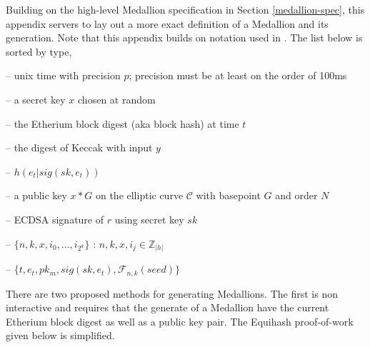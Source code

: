 
Building on the high-level Medallion specification in Section \ref{medallion-spec}, this appendix servers to lay out a more exact definition of a Medallion and its generation. Note that this appendix builds on notation used in \cite{Equihash}. The list below is sorted by type,
\begin{description}[align=right, labelwidth=2.7cm]
	\item[$t$ (uint)] -- unix time with precision $p$; precision must be at least on the order of 100ms
	\item[$sk_m$ (uint)]  -- a secret key $x$ chosen at random
    \item[$e_t$ (uint)]  -- the Etherium block digest (aka block hash) at time $t$ 
    \item[$h(y)$ (uint)]  -- the digest of Keccak with input $y$
    \item[$seed$ (uint)]  -- $h(e_t|sig(sk,e_t))$
    \item[$pk_m$ (tuple)]  -- a public key $x*G$ on the elliptic curve $\mathcal{C}$ with basepoint $G$ and order $N$
    \item[$sig(sk, r)$ (tuple)]  -- ECDSA signature of $r$ using secret key $sk$
    \item[$\mathcal{F}_{n,k}(x)$ (struct)] -- $\{n, k, x, i_0, ..., i_{2^{k}} \}$ : $n,k,x,i_j \in\mathbb{Z}_{|h|}$
	\item[$\mathcal{M}$ (struct)] -- $\{t, e_t, pk_m, sig(sk,e_t), \mathcal{F}_{n,k}(seed)\}$
\end{description}

There are two proposed methods for generating Medallions. The first is non interactive and requires that the generate of a Medallion have the current Etherium block digest as well as a public key pair. The Equihash proof-of-work given below is simplified.

